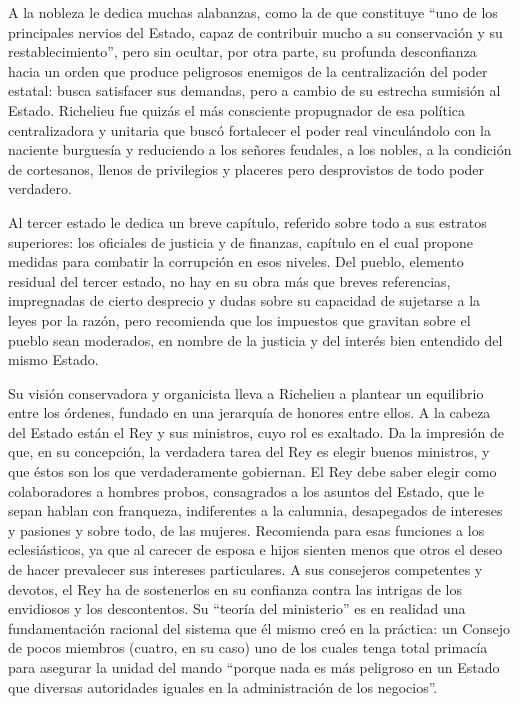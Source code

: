 \documentclass[
]{book}
\begin{document}
A la nobleza le dedica muchas alabanzas, como la de que constituye ``uno de los principales nervios del Estado, capaz de contribuir mucho a su conservación y su restablecimiento'', pero sin ocultar, por otra parte, su profunda desconfianza hacia un orden que produce peligrosos enemigos de la centralización del poder estatal: busca satisfacer sus demandas, pero a cambio de su estrecha sumisión al Estado. Richelieu fue quizás el más consciente propugnador de esa política centralizadora y unitaria que buscó fortalecer el poder real vinculándolo con la naciente burguesía y reduciendo a los señores feudales, a los nobles, a la condición de cortesanos, llenos de privilegios y placeres pero desprovistos de todo poder verdadero.

Al tercer estado le dedica un breve capítulo, referido sobre todo a sus estratos superiores: los oficiales de justicia y de finanzas, capítulo en el cual propone medidas para combatir la corrupción en esos niveles. Del pueblo, elemento residual del tercer estado, no hay en su obra más que breves referencias, impregnadas de cierto desprecio y dudas sobre su capacidad de sujetarse a la leyes por la razón, pero recomienda que los impuestos que gravitan sobre el pueblo sean moderados, en nombre de la justicia y del interés bien entendido del mismo Estado.

Su visión conservadora y organicista lleva a Richelieu a plantear un equilibrio entre los órdenes, fundado en una jerarquía de honores entre ellos. A la cabeza del Estado están el Rey y sus ministros, cuyo rol es exaltado. Da la impresión de que, en su concepción, la verdadera tarea del Rey es elegir buenos ministros, y que éstos son los que verdaderamente gobiernan. El Rey debe saber elegir como colaboradores a hombres probos, consagrados a los asuntos del Estado, que le sepan hablan con franqueza, indiferentes a la calumnia, desapegados de intereses y pasiones y sobre todo, de las mujeres. Recomienda para esas funciones a los eclesiásticos, ya que al carecer de esposa e hijos sienten menos que otros el deseo de hacer prevalecer sus intereses particulares. A sus consejeros competentes y devotos, el Rey ha de sostenerlos en su confianza contra las intrigas de los envidiosos y los descontentos. Su ``teoría del ministerio'' es en realidad una fundamentación racional del sistema que él mismo creó en la práctica: un Consejo de pocos miembros (cuatro, en su caso) uno de los cuales tenga total primacía para asegurar la unidad del mando ``porque nada es más peligroso en un Estado que diversas autoridades iguales en la administración de los negocios''.
\end{document}
